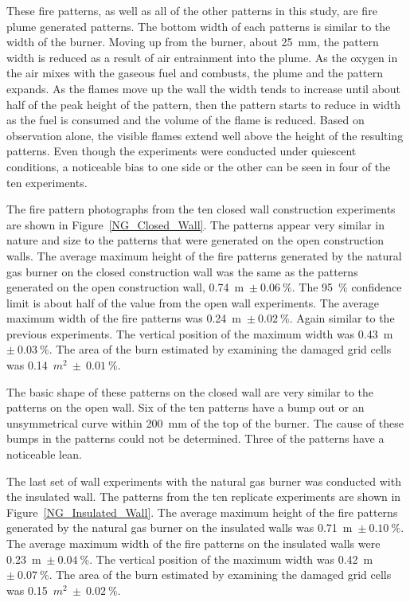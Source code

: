 \documentclass[twoside]{uocthesis}
\begin{document}
These fire patterns, as well as all of the other patterns in this study, are fire plume generated patterns. The bottom width of each patterns is similar to the width of the burner. Moving up from the burner, about 25~mm, the pattern width is reduced as a result of air entrainment into the plume.  As the oxygen in the air mixes with the gaseous fuel and combusts, the plume and the pattern expands.  As the flames move up the wall the width tends to increase until about half of the peak height of the pattern, then the pattern starts to reduce in width as the fuel is consumed and the volume of the flame is reduced.  Based on observation alone, the visible flames extend well above the height of the resulting patterns.  Even though the experiments were conducted under quiescent conditions, a noticeable bias to one side or the other can be seen in four of the ten experiments.           

The fire pattern photographs from the ten closed wall construction experiments are shown in Figure~\ref{NG_Closed_Wall}. 
The patterns appear very similar in nature and size to the patterns that were generated on the open construction walls.  The average maximum height of the fire patterns generated by the natural gas burner on the closed construction wall was the same as the patterns generated on the open construction wall, 0.74~m~$\pm~0.06~\%$.  The 95~$\%$ confidence limit is about half of the value from the open wall experiments. The average maximum width of the fire patterns was 0.24~m~$\pm~0.02~\%$.  Again similar to the previous experiments. The vertical position of the maximum width was 0.43~m~$\pm~0.03~\%$. The area of the burn estimated by examining the damaged grid cells was 0.14~$m^2~\pm~0.01~\%$.  

The basic shape of these patterns on the closed wall are very similar to the patterns on the open wall.  Six of the ten patterns have a bump out or an unsymmetrical curve within 200~mm of the top of the burner.  The cause of these bumps in the patterns could not be determined. Three of the patterns have a noticeable lean.     
  
The last set of wall experiments with the natural gas burner was conducted with the insulated wall.  The patterns from the ten replicate experiments are shown in Figure~\ref{NG_Insulated_Wall}.  The average maximum height of the fire patterns generated by the natural gas burner on the insulated walls was 0.71~m~$\pm~0.10~\%$.  The average maximum width of the fire patterns on the insulated walls were 0.23~m~$\pm~0.04~\%$.  The vertical position of the maximum width was 0.42~m~$\pm~0.07~\%$. The area of the burn estimated by examining the damaged grid cells was 0.15~$m^2~\pm~0.02~\%$.  
\end{document}
